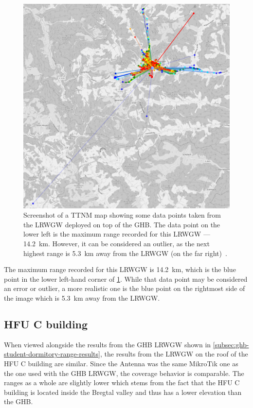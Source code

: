 \begin{figure}[htbp]
    \centering
    \includegraphics[width=1\textwidth]{pictures/ttn-mapper/gateway-ranges/ghb_mikrotik_gw_range.png}
    \caption{
        Screenshot of a \ac{TTNM} map showing some data points taken from the \acl{LRWGW} deployed on top of the \ac{GHB}.
        The data point on the lower left is the maximum range recorded for this \acl{LRWGW} --- \SI{14.2}{\kilo\meter}.
        However, it can be considered an outlier, as the next highest range is \SI{5.3}{\kilo\meter} away from the \acl{LRWGW} (on the far right)~\cite{ttn_mapper_ttn_2023}.
    }\label{pic:ghb_mikrotik_gw_range}
\end{figure}

The maximum range recorded for this \acl{LRWGW} is \SI{14.2}{\kilo\meter}, which is the blue point in the lower left-hand corner of \cref{pic:ghb_mikrotik_gw_range}.
While that data point may be considered an error or outlier, a more realistic one is the blue point on the rightmost side of the image which is \SI{5.3}{\kilo\meter} away from the \acl{LRWGW}.

\subsection{\acl{HFU} C building}

When viewed alongside the results from the \ac{GHB} \acl{LRWGW} shown in \cref{subsec:ghb-student-dormitory-range-results}, the results from the \acl{LRWGW} on the roof of the \ac{HFU} C building are similar.
Since the Antenna was the same MikroTik one as the one used with the \ac{GHB} \acl{LRWGW}, the coverage behavior is comparable.
The ranges as a whole are slightly lower which stems from the fact that the \ac{HFU} C building is located inside the Bregtal valley and thus has a lower elevation than the \ac{GHB}.

